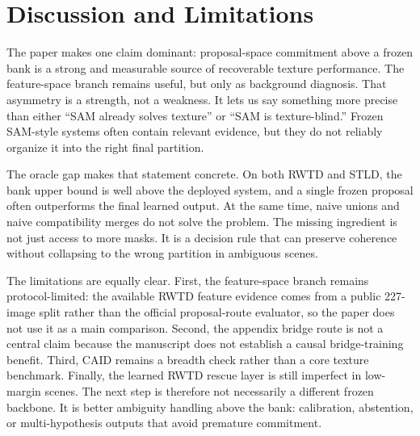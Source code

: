 \section{Discussion and Limitations}
\label{sec:discussion}

The paper makes one claim dominant: proposal-space commitment above a frozen bank is a strong and measurable source of recoverable texture performance. The feature-space branch remains useful, but only as background diagnosis. That asymmetry is a strength, not a weakness. It lets us say something more precise than either ``SAM already solves texture'' or ``SAM is texture-blind.'' Frozen SAM-style systems often contain relevant evidence, but they do not reliably organize it into the right final partition.

The oracle gap makes that statement concrete. On both RWTD and STLD, the bank upper bound is well above the deployed system, and a single frozen proposal often outperforms the final learned output. At the same time, naive unions and naive compatibility merges do not solve the problem. The missing ingredient is not just access to more masks. It is a decision rule that can preserve coherence without collapsing to the wrong partition in ambiguous scenes.

The limitations are equally clear. First, the feature-space branch remains protocol-limited: the available RWTD feature evidence comes from a public 227-image split rather than the official proposal-route evaluator, so the paper does not use it as a main comparison. Second, the appendix bridge route is not a central claim because the manuscript does not establish a causal bridge-training benefit. Third, CAID remains a breadth check rather than a core texture benchmark. Finally, the learned RWTD rescue layer is still imperfect in low-margin scenes. The next step is therefore not necessarily a different frozen backbone. It is better ambiguity handling above the bank: calibration, abstention, or multi-hypothesis outputs that avoid premature commitment.
